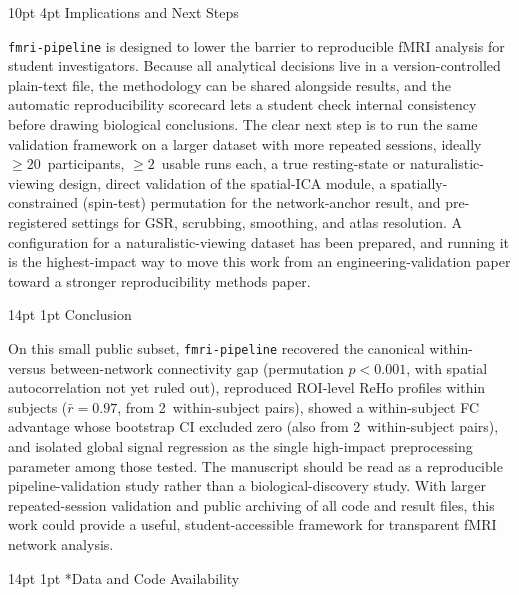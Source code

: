 \documentclass[12pt]{article}
\makeatletter
\renewcommand\section{%
  \@startsection{section}{1}{\z@}%
    {14pt \@plus 4pt \@minus 2pt}%
    {1pt}%
    {\normalfont\large\bfseries\color{black}}}
\renewcommand\subsection{%
  \@startsection{subsection}{2}{\z@}%
    {10pt \@plus 2pt \@minus 1pt}%
    {4pt}%
    {\normalfont\normalsize\bfseries}}
\makeatother
\begin{document}
\subsection{Implications and Next Steps}

\texttt{fmri-pipeline} is designed to lower the barrier to reproducible
fMRI analysis for student investigators. Because all analytical
decisions live in a version-controlled plain-text file, the methodology
can be shared alongside results, and the automatic reproducibility
scorecard lets a student check internal consistency before drawing
biological conclusions. The clear next step is to run the same
validation framework on a larger dataset with more repeated
sessions, ideally $\geq 20$~participants, $\geq 2$~usable runs each, a
true resting-state or naturalistic-viewing design, direct validation of
the spatial-ICA module, a spatially-constrained (spin-test) permutation
for the network-anchor result, and pre-registered settings for GSR,
scrubbing, smoothing, and atlas resolution. A configuration for a
naturalistic-viewing dataset has been prepared, and running it is the
highest-impact way to move this work from an engineering-validation
paper toward a stronger reproducibility methods paper.

\section{Conclusion}

On this small public subset, \texttt{fmri-pipeline} recovered the
canonical within- versus between-network connectivity gap (permutation
$p < 0.001$, with spatial autocorrelation not yet ruled out), reproduced
ROI-level ReHo profiles within subjects ($\bar{r} = 0.97$, from
2~within-subject pairs), showed a within-subject FC advantage whose
bootstrap CI excluded zero (also from 2~within-subject pairs), and
isolated global signal regression as the single high-impact
preprocessing parameter among those tested. The manuscript should be
read as a reproducible pipeline-validation study rather than a
biological-discovery study.
With larger repeated-session validation and public archiving of all
code and result files, this work could provide a useful,
student-accessible framework for transparent fMRI network analysis.

\section*{Data and Code Availability}
\end{document}
